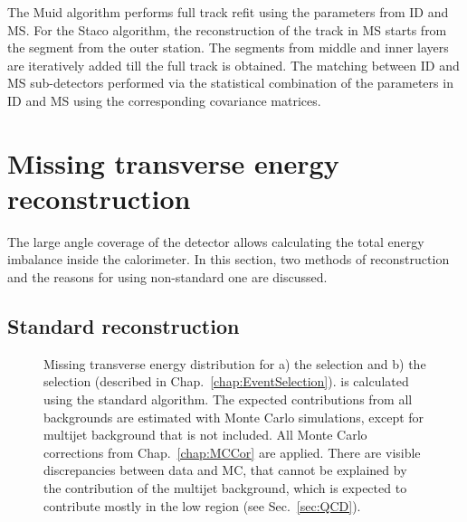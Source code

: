 The Muid algorithm performs full track refit using the parameters from ID and MS\cite{Muid}. 
For the Staco algorithm, the reconstruction of the track in MS starts from the segment from the outer station. The segments from middle and  inner layers are iteratively added till the full track is obtained. The matching between ID and MS sub-detectors performed via the statistical combination of the parameters in ID and MS using the corresponding covariance matrices\cite{Staco}. 

\section{Missing transverse energy reconstruction}\label{sec:EtMissRec}

The large angle coverage of the \atlas detector allows calculating the total energy imbalance inside the calorimeter. In this section, two methods of \etmiss reconstruction and the reasons for using non-standard one are discussed.

\subsection{Standard reconstruction}

\begin{figure}[!tb]
\begin{minipage}[h]{0.49\linewidth}
\end{minipage}
\hfill
\begin{minipage}[h]{0.49\linewidth}
\end{minipage}
\caption{Missing transverse energy distribution for a) the \wenu selection and  b) the \wmunu selection (described in Chap.~\ref{chap:EventSelection}). \etmiss is calculated using the standard \atlas algorithm. The expected contributions from all backgrounds are estimated with Monte Carlo simulations, except for multijet background that is not included. All Monte Carlo corrections from Chap.~\ref{chap:MCCor} are applied. There are visible discrepancies between data and MC, that cannot be explained by the contribution of the multijet background, which is expected to contribute mostly in the low \etmiss region (see Sec.~\ref{sec:QCD}).}
\label{ris:EtMissRefFinal}
\end{figure}

